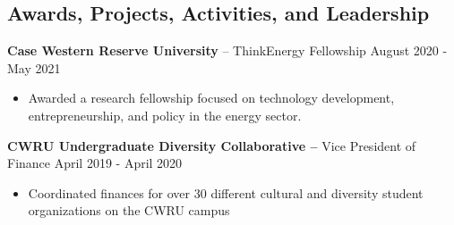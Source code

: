 \documentclass{res}
\begin{document}
\begin{resume}
\section{Awards, Projects, Activities, and Leadership} 
{\bf Case Western Reserve University} – ThinkEnergy Fellowship   \hfill    August 2020 - May 2021 
\begin{itemize} \itemsep -2pt
	\item Awarded a research fellowship focused on technology development, entrepreneurship, and policy in the energy sector.
\end{itemize}
{\bf CWRU Undergraduate Diversity Collaborative –} Vice President of Finance     \hfill    April 2019 - April 2020 
 \begin{itemize} \itemsep -2pt
 \item Coordinated finances for over 30 different cultural and diversity student organizations on the CWRU campus 
 \end{itemize}

		

\end{resume} 
\end{document}
